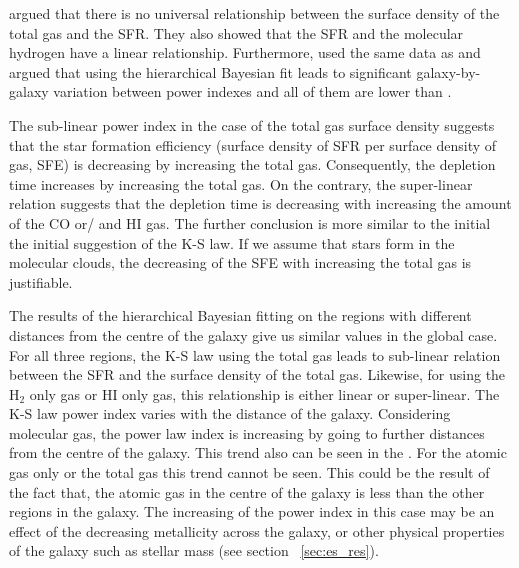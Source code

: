 \documentclass[useAMS,usenatbib]{mn2e}
\begin{document}
 \cite{Bigiel08} argued that there is no universal relationship between the surface density of the total gas and the SFR. They also showed that the SFR and the molecular hydrogen have a linear relationship. Furthermore, \cite{Shetty13} used the same data as \cite{Bigiel08} and argued that using the hierarchical Bayesian fit leads to significant galaxy-by-galaxy variation between power indexes and all of them are lower than \cite{Bigiel08}. 

The sub-linear power index in the case of the total gas surface density suggests that the star formation efficiency (surface density of SFR per surface density of gas, SFE) is decreasing by increasing the total gas. Consequently, the depletion time increases by increasing the total gas. On the contrary, the super-linear relation suggests that the depletion time is decreasing with increasing the amount of the CO or/ and HI gas. The further conclusion is more similar to the initial the initial suggestion of the K-S law. %
If we assume that stars form in the molecular clouds, the decreasing of the SFE with increasing the total gas is justifiable.  

The results of the hierarchical Bayesian fitting on the regions with different distances from the centre of the galaxy give us similar values in the global case. For all three regions, the K-S law using the total gas leads to sub-linear relation between the SFR and the surface density of the total gas. Likewise, for using the H$_{2}$ only gas or HI only gas, this relationship is either linear or super-linear. The K-S law power index varies with the distance of the galaxy. Considering molecular gas, the power law index is increasing by going to further distances from the centre of the galaxy. This trend also can be seen in the \cite{Ford13}. For the atomic gas only or the total gas this trend cannot be seen. This could be the result of the fact that, the atomic gas in the centre of the galaxy is less than the other regions in the galaxy. 
The increasing of the power index in this case may be an effect of the decreasing metallicity across the galaxy, or other physical properties of the galaxy such as stellar mass (see section ~\ref{sec:es_res}).
  
\end{document}
